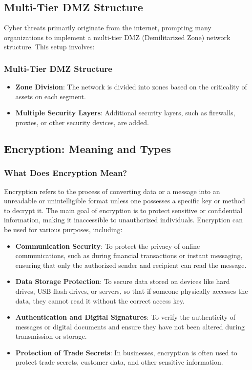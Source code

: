 \subsection{Multi-Tier DMZ Structure}

Cyber threats primarily originate from the internet, prompting many organizations to implement a multi-tier DMZ (Demilitarized Zone) network structure. This setup involves:

\subsubsection{Multi-Tier DMZ Structure}

\begin{itemize}
    \item \textbf{Zone Division}: The network is divided into zones based on the criticality of assets on each segment.
    \item \textbf{Multiple Security Layers}: Additional security layers, such as firewalls, proxies, or other security devices, are added.
\end{itemize}


\subsection{Encryption: Meaning and Types}

\subsubsection{What Does Encryption Mean?}

Encryption refers to the process of converting data or a message into an unreadable or unintelligible format unless one possesses a specific key or method to decrypt it. The main goal of encryption is to protect sensitive or confidential information, making it inaccessible to unauthorized individuals. Encryption can be used for various purposes, including:

\begin{itemize}
    \item \textbf{Communication Security}: To protect the privacy of online communications, such as during financial transactions or instant messaging, ensuring that only the authorized sender and recipient can read the message.
    \item \textbf{Data Storage Protection}: To secure data stored on devices like hard drives, USB flash drives, or servers, so that if someone physically accesses the data, they cannot read it without the correct access key.
    \item \textbf{Authentication and Digital Signatures}: To verify the authenticity of messages or digital documents and ensure they have not been altered during transmission or storage.
    \item \textbf{Protection of Trade Secrets}: In businesses, encryption is often used to protect trade secrets, customer data, and other sensitive information.
\end{itemize}

